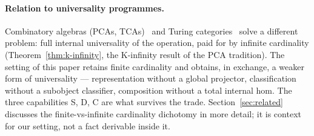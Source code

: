 \paragraph{Relation to universality programmes.} Combinatory algebras
(PCAs, TCAs)~\cite{vanoosten08, longley15, bethke88} and Turing
categories~\cite{cockett08} solve a different problem: full internal
universality of the operation, paid for by infinite cardinality
(Theorem~\ref{thm:k-infinity}, the K-infinity result of the PCA tradition).
The setting of this paper retains finite cardinality and obtains, in
exchange, a weaker form of universality --- representation without a
global projector, classification without a subobject classifier,
composition without a total internal hom. The three capabilities S, D, C
are what survives the trade. Section~\ref{sec:related} discusses the
finite-vs-infinite cardinality dichotomy in more detail; it is context
for our setting, not a fact derivable inside it.

